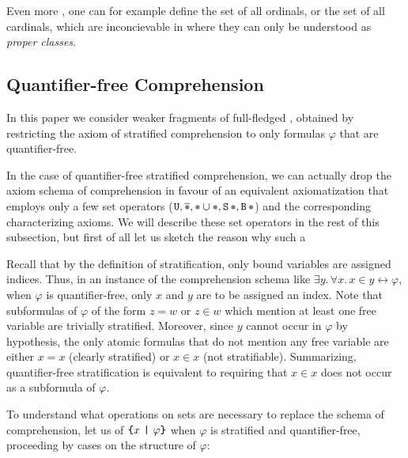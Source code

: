 \documentclass[sigplan,10pt,anonymous,review]{acmart}%
\begin{document}
Even more , one can for example define the set of all ordinals, or the set of all cardinals, which are inconcievable in \ZF{} where they can only be understood as \emph{proper classes}.



\subsection{Quantifier-free Comprehension}

In this paper we consider weaker fragments of full-fledged \NF{}, obtained by restricting the axiom of stratified comprehension to only formulas $\varphi$ that are quantifier-free. 

In the case of quantifier-free stratified comprehension, we can actually drop the axiom schema of comprehension in favour of an equivalent axiomatization that employs only a few set operators ($\Universe, \Complement \Placeholder, \Union \Placeholder \Placeholder, \Sing\Placeholder, \Essence\Placeholder$) and the corresponding characterizing axioms. We will describe these set operators in the rest of this subsection, but first of all let us sketch the reason why such a \TODO{}

Recall that by the definition of stratification, only bound variables are assigned indices. Thus, in an instance of the comprehension schema like $\exists y.\, \forall x.\, x \in y \leftrightarrow \varphi$, when $\varphi$ is quantifier-free, only $x$ and $y$ are to be assigned an index. Note that subformulas of $\varphi$ of the form $z = w$ or $z \in w$ which mention at least one free variable are trivially stratified. Moreover, since $y$ cannot occur in $\varphi$ by hypothesis, the only atomic formulas that do not mention any free variable are either $x=x$ (clearly stratified) or $x\in x$ (not stratifiable).
% 
Summarizing, quantifier-free stratification is equivalent to requiring that $x\in x$ does not occur as a subformula of $\varphi$.


To understand what operations on sets are necessary to replace the schema of comprehension, let us  of $\text{\texttt{\{}} x ~\text{\texttt{|}}~ \varphi \text{\texttt{\}}}$ when $\varphi$ is stratified and quantifier-free, proceeding by cases on the structure of $\varphi$:
\end{document}
